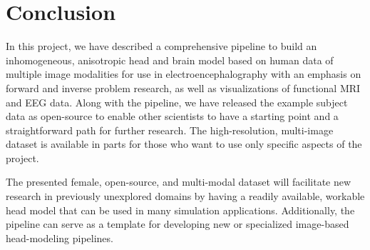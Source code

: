 
\section{Conclusion}
\label{sec:Conclusion}


In this project, we have described a comprehensive pipeline to build an inhomogeneous, anisotropic head and brain model based on human data of multiple image modalities for use in electroencephalography with an emphasis on forward and inverse problem research, as well as visualizations of functional MRI and EEG data. Along with the pipeline, we have released the example subject data as open-source to enable other scientists to have a starting point and a straightforward path for further research. The high-resolution, multi-image dataset is available in parts for those who want to use only specific aspects of the project.

The presented female, open-source, and multi-modal dataset will facilitate new research in previously unexplored domains by having a readily available, workable head model that can be used in many simulation applications. Additionally, the pipeline can serve as a template for developing new or specialized image-based head-modeling pipelines. 